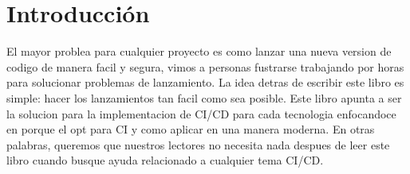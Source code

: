 \chapter{Introducción}
El mayor problea para cualquier proyecto es como lanzar una nueva version de codigo de manera facil y segura, vimos a personas fustrarse trabajando por horas para solucionar problemas de lanzamiento. La idea detras de escribir este libro es simple: hacer los lanzamientos tan facil como sea posible. Este libro apunta a ser la solucion para la implementacion de CI/CD para cada tecnologia enfocandoce en porque el opt para CI y como aplicar en una manera moderna. En otras palabras, queremos que nuestros lectores no necesita nada despues de leer este libro cuando busque ayuda relacionado a cualquier tema CI/CD.
\begin{lstlisting}[language=html]
\end{lstlisting}

